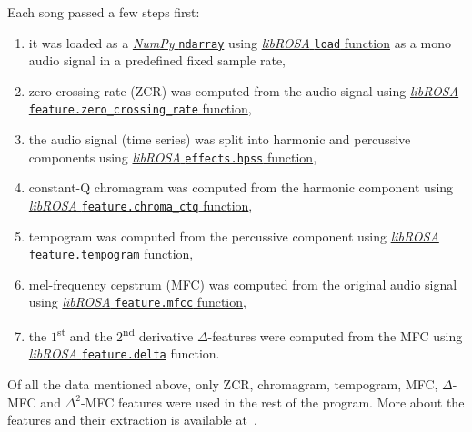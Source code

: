 \documentclass[conference, a4paper, 12pt]{IEEEtran}
\begin{document}
    Each song passed a few steps first:
    \begin{enumerate}
        \item it was loaded as a \href{http://numpy.org/doc/stable/reference/generated/numpy.ndarray.html}{\emph{NumPy} \lstinline[style = myprogram, language = Python]{ndarray}} using \href{http://librosa.org/doc/latest/generated/librosa.load.html}{\emph{libROSA} \lstinline[style = myprogram, language = Python]{load} function} as a mono audio signal in a predefined fixed sample rate,
        \item zero-crossing rate (ZCR) was computed from the audio signal using \href{http://librosa.org/doc/latest/generated/librosa.feature.zero_crossing_rate.html}{\emph{libROSA} \lstinline[style = myprogram, language = Python]{feature.zero_crossing_rate} function},
        \item the audio signal (time series) was split into harmonic and percussive components using \href{http://librosa.org/doc/latest/generated/librosa.effects.hpss.html}{\emph{libROSA} \lstinline[style = myprogram, language = Python]{effects.hpss} function},
        \item constant-Q chromagram was computed from the harmonic component using \href{http://librosa.org/doc/latest/generated/librosa.feature.chroma_cqt.html}{\emph{libROSA} \lstinline[style = myprogram, language = Python]{feature.chroma_ctq} function},
        \item tempogram was computed from the percussive component using \href{http://librosa.org/doc/latest/generated/librosa.feature.tempogram.html}{\emph{libROSA} \lstinline[style = myprogram, language = Python]{feature.tempogram} function},
        \item mel-frequency cepstrum (MFC) was computed from the original audio signal using \href{http://librosa.org/doc/latest/generated/librosa.feature.mfcc.html}{\emph{libROSA} \lstinline[style = myprogram, language = Python]{feature.mfcc} function},
        \item the $ 1 $\textsuperscript{st} and the $ 2 $\textsuperscript{nd} derivative $ \Delta $-features were computed from the MFC using \href{http://librosa.org/doc/latest/generated/librosa.feature.delta.html}{\emph{libROSA} \lstinline[style = myprogram, language = Python]{feature.delta}} function.
    \end{enumerate}
    Of all the data mentioned above, only ZCR, chromagram, tempogram, MFC, $ \Delta $-MFC and $ \Delta^{2} $-MFC features were used in the rest of the program. More about the features and their extraction is available at~\cite{bib:McFee2015}.
\end{document}
